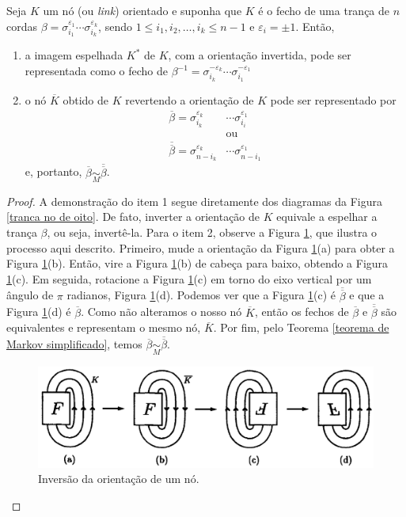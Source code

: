 	\begin{prop}
	\label{representacao no espelhado}
		Seja $K$ um nó (ou \textit{link}) orientado e suponha que $K$ é o fecho de 
		uma trança de $n$ cordas $\beta = \sigma_{i_1}^{\varepsilon_1}\cdots\sigma_{i_k}^{\varepsilon_k}$, 
		sendo $1\leq i_1, i_2, \dots, i_k\leq n-1$ e $\varepsilon_i=\pm1$. Então,
		\begin{enumerate}
			\item a imagem espelhada $K^\ast$ de $K$, com a orientação invertida, 
			pode ser representada como o fecho de 
			$\beta^{-1}  = \sigma_{i_k}^{-\varepsilon_{k}}\cdots\sigma_{i_1}^{-\varepsilon_1}$ 
			\item o nó $\overline{K}$ obtido de $K$ revertendo a orientação de $K$ pode ser representado por
			\begin{align*}
			\overline{\beta} = \sigma_{i_k}^{\varepsilon_k}&\cdots\sigma_{i_i}^{\varepsilon_1} \\
			&\text{ou} \\
			\overline{\overline{\beta}} = \sigma_{n-i_k}^{\varepsilon_k}&\cdots\sigma_{n - i_1}^{\varepsilon_1}
			\end{align*}
			e, portanto, $\overline{\beta}\underset{M}{\sim}\overline{\overline{\beta}}$. 
		\end{enumerate}
	\end{prop}
	\begin{proof}
		A demonstração do item 1 segue diretamente dos diagramas da Figura \ref{tranca no de oito}. 
		De fato, inverter a orientação de $K$ equivale a espelhar a trança $\beta$, ou seja, invertê-la. 
		Para o item 2, observe a Figura \ref{no invertido}, que ilustra o processo aqui descrito. 
		Primeiro, mude a orientação da Figura \ref{no invertido}(a) para obter a 
		Figura \ref{no invertido}(b). Então, vire a Figura \ref{no invertido}(b) de cabeça para baixo, 
		obtendo a Figura \ref{no invertido}(c). Em seguida, rotacione a Figura \ref{no invertido}(c) 
		em torno do eixo vertical por um ângulo de $\pi$ radianos, Figura \ref{no invertido}(d). 
		Podemos ver que a Figura \ref{no invertido}(c) é $\overline{\overline{\beta}}$ e que a 
		Figura \ref{no invertido}(d) é $\overline{\beta}$. Como não alteramos o nosso nó $\overline{K}$, 
		então os fechos de $\overline{\beta}$ e $\overline{\overline{\beta}}$ são equivalentes e 
		representam o mesmo nó, $\overline{K}$. Por fim, pelo Teorema \ref{teorema de Markov simplificado}, 
		temos $\overline{\beta}\underset{M}{\sim}\overline{\overline{\beta}}$.
		\begin{figure}[H]
			\begin{center}
				\includegraphics[width=12cm]{Images/no_invertido.png}
			\end{center}\caption{Inversão da orientação de um nó.}\label{no invertido}
		\end{figure}
	\end{proof}
